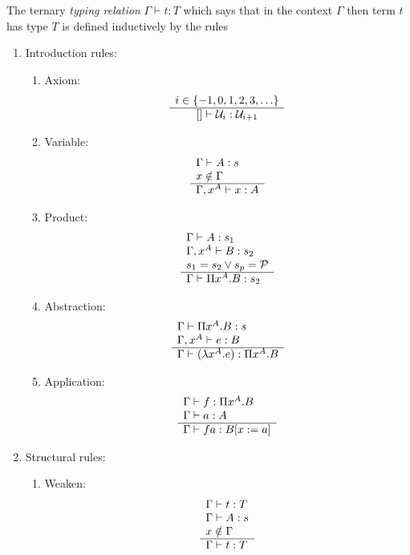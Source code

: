 \begin{definition}
    The ternary \emph{typing relation} $\Gamma \vdash t: T$ which says that in
    the context $\Gamma$ then term $t$ has type $T$ is defined inductively by
    the rules
    \begin{enumerate}
    \item Introduction rules:
        \begin{enumerate}
            \item Axiom:
                $$
                \begin{array}{c} i \in \{-1, 0, 1, 2, 3, \ldots \} \\ \hline  [] \vdash {\cal U}_i : {\cal U}_{i + 1}\end{array}
                $$

        \item Variable:
            $$
            \begin{array}{l} 
                \Gamma \vdash A: s
                \\
                x \notin \Gamma
             \\ \hline 
                \Gamma, x^A \vdash x: A
            \end{array}
            $$

        \item Product:
            $$
            \begin{array}{l} 
                \Gamma \vdash A: s_1
                \\
                \Gamma, x^A \vdash B: s_2
                \\
                s_1 = s_2 \lor s_p = {\cal P}
             \\ \hline 
                \Gamma \vdash \Pi x^A.B : s_2
            \end{array}
            $$

        \item Abstraction:
            $$
            \begin{array}{l} 
                \Gamma \vdash \Pi x^A. B: s
                \\
                \Gamma, x^A \vdash e: B
             \\ \hline 
                \Gamma \vdash (\lambda x^A. e): \Pi x^A. B
            \end{array}
            $$

        \item Application:
            $$
            \begin{array}{l} 
                \Gamma \vdash f: \Pi x^A. B
                \\
                \Gamma \vdash a: A
             \\ \hline 
                \Gamma \vdash f a: B[x:=a]
            \end{array}
            $$
        \end{enumerate}


    \item Structural rules:
        \begin{enumerate}
        \item Weaken:
            $$
            \begin{array}{l} 
                \Gamma \vdash t: T
                \\
                \Gamma \vdash A: s
                \\
                x \notin \Gamma
             \\ \hline 
                \Gamma \vdash t: T
            \end{array}
            $$


\end{enumerate}
\end{enumerate}
\end{definition}
